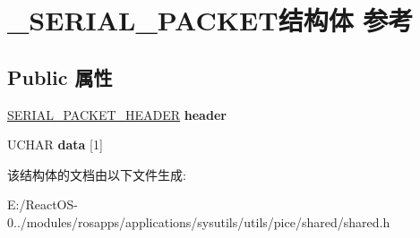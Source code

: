 \hypertarget{struct___s_e_r_i_a_l___p_a_c_k_e_t}{}\section{\+\_\+\+S\+E\+R\+I\+A\+L\+\_\+\+P\+A\+C\+K\+E\+T结构体 参考}
\label{struct___s_e_r_i_a_l___p_a_c_k_e_t}
\subsection*{Public 属性}
\begin{DoxyCompactItemize}
\item 
\mbox{\label{struct___s_e_r_i_a_l___p_a_c_k_e_t_a0426a9e554ee07f8d89959da5f921b7a}} 
\hyperlink{struct___s_e_r_i_a_l___p_a_c_k_e_t___h_e_a_d_e_r}{S\+E\+R\+I\+A\+L\+\_\+\+P\+A\+C\+K\+E\+T\+\_\+\+H\+E\+A\+D\+ER} {\bfseries header}
\item 
\mbox{\label{struct___s_e_r_i_a_l___p_a_c_k_e_t_a1fadcece6577f9e07c2f45f2b4ee31e1}} 
U\+C\+H\+AR {\bfseries data} \mbox{[}1\mbox{]}
\end{DoxyCompactItemize}


该结构体的文档由以下文件生成\+:\begin{DoxyCompactItemize}
\item 
E\+:/\+React\+O\+S-\/0../modules/rosapps/applications/sysutils/utils/pice/shared/shared.\+h\end{DoxyCompactItemize}
